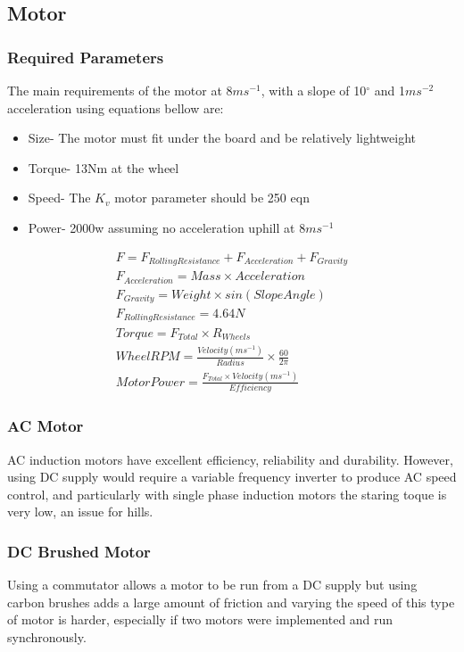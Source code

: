 \documentclass[journal,10pt]{IEEEtran}
\begin{document}
    \subsection{Motor}
        \subsubsection{Required Parameters}
        The main requirements of the motor at 8$ms^{-1}$, with a slope of 10$^{\circ}$ and 1$ms^{-2}$ acceleration using equations bellow are:
        \begin{itemize}
        	\item Size- The motor must fit under the board and be relatively lightweight
        	\item Torque- 13Nm at the wheel 
        	\item Speed- The $K_{v}$ motor parameter should be 250 eqn
        	\item Power- 2000w assuming no acceleration uphill at 8$ms^{-1}$
        \end{itemize}
        \begin{gather}
            F = F_{Rolling Resistance} + F_{Acceleration} + F_{Gravity}\\
            F_{Acceleration} = Mass \times Acceleration\\
            F_{Gravity} = Weight \times sin(Slope Angle)\\
            F_{Rolling Resistance} = 4.64N\\
            Torque = F_{Total} \times R_{Wheels}\\
            Wheel RPM = \frac{Velocity (ms^{-1})}{Radius}\times \frac{60}{2\pi}\\ 
            Motor Power = \frac{F_{Total} \times Velocity (ms^{-1})}{Efficiency}
        \end{gather}
        \subsubsection{AC Motor}
            AC induction motors have excellent efficiency, reliability and durability. However, using DC supply would require a variable frequency inverter to produce AC speed control, and particularly with single phase induction motors the staring toque is very low, an issue for hills. 
        \subsubsection{DC Brushed Motor}
            Using a commutator allows a motor to be run from a DC supply but using carbon brushes adds a large amount of friction and varying the speed of this type of motor is harder, especially if two motors were implemented and run synchronously.
\end{document}
